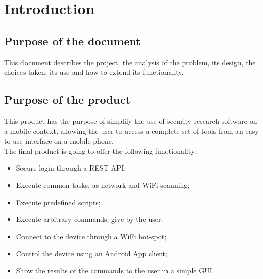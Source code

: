 \documentclass[../PiTest.tex]{subfiles}
\begin{document}
\section{Introduction}

	\subsection{Purpose of the document}
	This document describes the project, the analysis of the problem, its design, the choices taken, its use and how to extend its functionality.
	
	\subsection{Purpose of the product}
	This product has the purpose of simplify the use of security research software on a mobile context, allowing the user to access a complete set of tools from an easy to use interface on a mobile phone.\\
	The final product is going to offer the following functionality:
	\begin{itemize}
		\item Secure login through a REST API;
		\item Execute common tasks, as network and WiFi scanning;
		\item Execute predefined scripts;
		\item Execute arbitrary commands, give by the user;
		\item Connect to the device through a WiFi hot-spot;
		\item Control the device using an Android App client;
		\item Show the results of the commands to the user in a simple GUI.
	\end{itemize}
	
\end{document}
